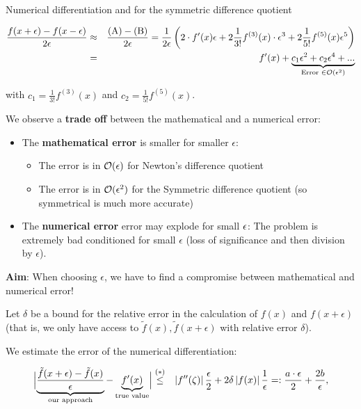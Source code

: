 \begin{vbframe}{Numerical differentiation}
  and for the symmetric difference quotient
  
  \begin{footnotesize}
  \begin{eqnarray*}
  \frac{f(x + \epsilon) - f(x - \epsilon)}{2 \epsilon} &\approx& \frac{\text{(A)} - \text{(B)} }{2 \epsilon} = \frac{1}{2 \epsilon} \left(2\cdot f\!\,'(x) \epsilon + 2 \frac{1}{3 !}f^{(3)}(x)\cdot\epsilon^3 + 2  \frac{1}{5 !}f^{(5)}(x)\epsilon^5  \right) \\ &=&
  f\!\,'(x) +
  \underbrace{c_1\epsilon^2 + c_2 \epsilon^4 + ... }_{\text{Error } \in \mathcal{O}(\epsilon^2)} \\
  \end{eqnarray*}
  \end{footnotesize}
  
  with $c_1 = \frac{1}{3 !}f^{(3)}(x)$ and $c_2 = \frac{1}{5 !}f^{(5)}(x)$.
  
  \framebreak
  
  We observe a \textbf{trade off} between the mathematical and a numerical error:
  \begin{itemize}
  \item The \textbf{mathematical error} is smaller for smaller $\epsilon$:
  \begin{itemize}
  \item The error is in $\mathcal{O}(\epsilon)$ for Newton's difference quotient
  \item The error is in $\mathcal{O}(\epsilon^2)$ for the Symmetric difference quotient (so symmetrical is much more accurate)
  \end{itemize}
  \item The \textbf{numerical error} error may explode for small $\epsilon$: The problem is extremely bad conditioned for small $\epsilon$ (loss of significance and then division by $\epsilon$).
  \end{itemize}
  
  \lz
  
  \textbf{Aim}: When choosing $\epsilon$, we have to find a compromise between mathematical and numerical error!
  
  \framebreak
  
  Let $\delta$ be a bound for the relative error in the calculation of
  $f(x)$ and $f(x+\epsilon)$ (that is, we only have access to $\tilde f(x), \tilde f(x + \epsilon)$ with relative error $\delta$).
  
  \lz
  
  We estimate the error of the numerical differentiation:
  \begin{footnotesize}
  \begin{eqnarray*}
  \Bigl|\underbrace{\frac{\tilde f(x+\epsilon) - \tilde f(x)}{\epsilon}}_{\text{our approach}} - \underbrace{f\!\,'(x)}_{\text{true value}} \Bigr| &\overset{(*)}{\le}& \left| f\!\,''(\zeta)\right|\frac{\epsilon}{2} + 2 \delta\left| f(x) \right|\frac 1\epsilon
  =: \frac{a\cdot\epsilon}2 + \frac{2b}\epsilon, \\
  \end{eqnarray*}
  \end{footnotesize}
  

\end{vbframe}

